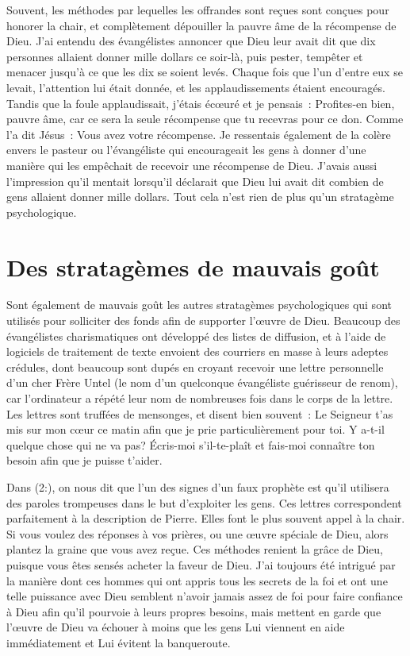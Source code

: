 \begin{specialpar}{}
Souvent, les méthodes par lequelles les offrandes sont reçues
 sont conçues pour honorer la chair, et complètement dépouiller
 la pauvre âme de la récompense de Dieu. J'ai entendu des évangélistes
 annoncer que Dieu leur avait dit que dix personnes allaient donner
 mille dollars ce soir-là, puis pester, tempêter et menacer jusqu'à
 ce que les dix se soient levés. Chaque fois que l'un d'entre eux
 se levait, l'attention lui était donnée, et les applaudissements
 étaient encouragés. Tandis que la foule applaudissait,
 j'étais écœuré et je pensais~: \og Profites-en bien, pauvre âme,
 car ce sera la seule récompense que tu recevras pour ce don. \fg{}
 Comme l'a dit Jésus~: \og Vous avez votre récompense. \fg{}
 Je ressentais également de la colère envers le pasteur
 ou l'évangéliste qui encourageait les gens à donner d'une manière
 qui les empêchait de recevoir une récompense de Dieu.
 J'avais aussi l'impression qu'il mentait lorsqu'il déclarait
 que Dieu lui avait dit combien de gens allaient donner mille dollars.
 Tout cela n'est rien de plus qu'un stratagème psychologique.
\end{specialpar}


\section*{Des stratagèmes de mauvais goût}

Sont également de mauvais goût les autres stratagèmes psychologiques
 qui sont utilisés pour solliciter des fonds afin de supporter l'œuvre
 de Dieu. Beaucoup des évangélistes charismatiques ont développé
 des listes de diffusion, et à l'aide de logiciels de traitement
 de texte envoient des courriers en masse à leurs adeptes crédules,
 dont beaucoup sont dupés en croyant recevoir une lettre personnelle
 d'un cher Frère Untel (le nom d'un quelconque évangéliste guérisseur
 de renom), car l'ordinateur a répété leur nom de nombreuses fois
 dans le corps de la lettre. Les lettres sont truffées de mensonges,
 et disent bien souvent~: \og Le Seigneur t'as mis sur mon cœur
 ce matin afin que je prie particulièrement pour toi.
 Y a-t-il quelque chose qui ne va pas? Écris-moi s'il-te-plaît
 et fais-moi connaître ton besoin afin que je puisse t'aider. \fg{}

Dans (2:), on nous dit que l'un des signes
 d'un faux prophète est qu'il utilisera des paroles trompeuses
 dans le but d'ex\-ploi\-ter les gens. Ces lettres correspondent parfaitement
 à la description de Pierre. Elles font le plus souvent appel à la chair.
 Si vous voulez des réponses à vos prières, ou une œuvre spéciale de Dieu,
 alors plantez la graine que vous avez reçue.
 Ces méthodes renient la grâce de Dieu, puisque vous êtes sensés acheter
 la faveur de Dieu. J'ai toujours été intrigué par la manière dont
 ces hommes qui ont appris tous les secrets de la foi
 et ont une telle puissance avec Dieu semblent n'avoir jamais assez
 de foi pour faire confiance à Dieu afin qu'il pourvoie
 à leurs propres besoins, mais mettent en garde que l'œuvre de Dieu
 va échouer à moins que les gens Lui viennent en aide
 immédiatement et Lui évitent la banqueroute.


